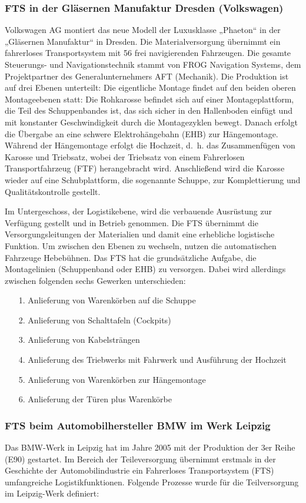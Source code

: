 \subsubsection{FTS in der Gl\"asernen Manufaktur Dresden (Volkswagen)}
Volkswagen AG montiert das neue Modell der Luxusklasse „Phaeton“ in der „Gl\"asernen Manufaktur“ in Dresden.
Die Materialversorgung \"ubernimmt ein fahrerloses Transportsystem mit 56 frei navigierenden Fahrzeugen.
Die gesamte Steuerungs- und Navigationstechnik stammt von FROG Navigation Systems, dem Projektpartner des Generalunternehmers AFT (Mechanik).
Die Produktion ist auf drei Ebenen unterteilt:
Die eigentliche Montage findet auf den beiden oberen Montageebenen statt:
Die Rohkarosse befindet sich auf einer Montageplattform, die Teil des Schuppenbandes ist, das sich sicher 
in den Hallenboden einf\"ugt und mit konstanter Geschwindigkeit durch die Montagezyklen bewegt.
Danach erfolgt die \"Ubergabe an eine schwere Elektroh\"angebahn (EHB) zur H\"angemontage.
W\"ahrend der H\"angemontage erfolgt die Hochzeit, d.~h. das Zusammenf\"ugen von Karosse und Triebsatz, 
wobei der Triebsatz von einem Fahrerlosen Transportfahrzeug (FTF) herangebracht wird.
Anschlie\ss end wird die Karosse wieder auf eine Schubplattform, die sogenannte Schuppe, zur Komplettierung und Qualit\"atskontrolle gestellt.

Im Untergeschoss, der Logistikebene, wird die verbauende Ausr\"ustung zur Verf\"ugung gestellt und in Betrieb genommen.
Die FTS \"ubernimmt die Versorgungsleitungen der Materialien und damit eine erhebliche logistische Funktion.
Um zwischen den Ebenen zu wechseln, nutzen die automatischen Fahrzeuge Hebeb\"uhnen.
Das FTS hat die grunds\"atzliche Aufgabe, die Montagelinien (Schuppenband oder EHB) zu versorgen.
Dabei wird allerdings zwischen folgenden sechs Gewerken unterschieden:
\begin{itemize}
\item[1.] Anlieferung von Warenk\"orben auf die Schuppe  
\item[2.] Anlieferung von Schalttafeln (Cockpits)
\item[3.] Anlieferung von Kabelstr\"angen
\item[4.] Anlieferung des Triebwerks mit Fahrwerk und Ausf\"uhrung der Hochzeit
\item[5.] Anlieferung von Warenk\"orben zur H\"angemontage
\item[6.] Anlieferung der T\"uren plus Warenk\"orbe
\end{itemize} 
\subsubsection{FTS beim Automobilhersteller BMW im Werk Leipzig}
Das BMW-Werk in Leipzig hat im Jahre 2005 mit der Produktion der 3er Reihe (E90) gestartet.
Im Bereich der Teileversorgung \"ubernimmt erstmals in der Geschichte der Automobilindustrie ein Fahrerloses Transportsystem (FTS) umfangreiche Logistikfunktionen.
Folgende Prozesse wurde f\"ur die Teilversorgung im Leipzig-Werk definiert:

